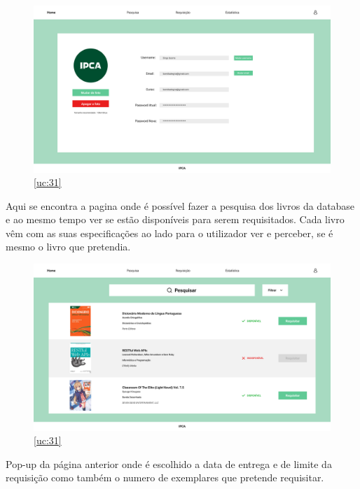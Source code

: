 \begin{figure}[H]
	\centering
	\includegraphics[width=1\linewidth]{../Mockups/PNGs/Perfil do utilizador.png}  %
	\caption{\ref{uc:31}}
	\label{fig:chap230}
\end{figure}

\newpage

Aqui se encontra a pagina onde é possível fazer a pesquisa dos livros da database e ao mesmo tempo ver se estão disponíveis para serem requisitados. Cada livro vêm com as suas especificações ao lado para o utilizador ver e perceber, se é mesmo o livro que pretendia. 

\begin{figure}[H]
	\centering
	\includegraphics[width=1\linewidth]{../Mockups/PNGs/Pesquisa dos livros.png}  %
	\caption{\ref{uc:31}}
	\label{fig:chap230}
\end{figure}

\newpage 

Pop-up da página anterior onde é escolhido a data de entrega e de limite da requisição como também o numero de exemplares que pretende requisitar.

